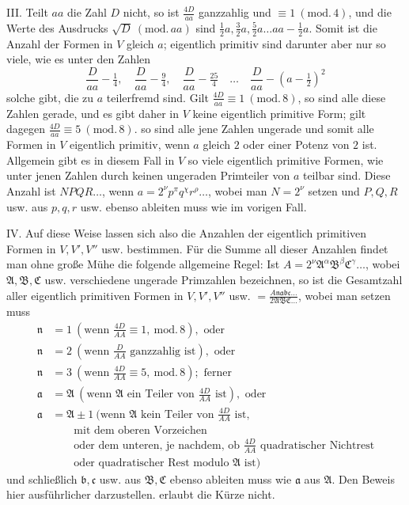 III. Teilt \(aa\) die Zahl \(D\) nicht, so ist \(\frac{4D}{aa}\) ganzzahlig und \(\equiv1\ (\mathrm{mod.}\,4)\), und die Werte des Ausdrucks \(\surd D\ (\mathrm{mod.}\,aa)\) sind \(\frac12 a,\frac32 a,\frac52 a\ldots aa-\frac12 a\). Somit ist die Anzahl der Formen in \(V\) gleich \(a\); eigentlich primitiv sind darunter aber nur so viele, wie es unter den Zahlen
\[
\frac{D}{aa}-\tfrac14,\quad\frac{D}{aa}-\tfrac94,\quad\frac{D}{aa}-\tfrac{25}{4}\quad\ldots\quad\frac{D}{aa}-(a-\tfrac12)^2
\]
solche gibt, die zu \(a\) teilerfremd sind. Gilt \(\frac{4D}{aa}\equiv1\ (\mathrm{mod.}\,8)\), so sind alle diese Zahlen gerade, und es gibt daher in \(V\) keine eigentlich primitive Form; gilt dagegen \(\frac{4D}{aa}\equiv5\ (\mathrm{mod.}\,8)\). so sind alle jene Zahlen ungerade und somit alle Formen in \(V\) eigentlich primitiv, wenn \(a\) gleich \(2\) oder einer Potenz von \(2\) ist. Allgemein gibt es in diesem Fall in \(V\) so viele eigentlich primitive Formen, wie unter jenen Zahlen durch keinen ungeraden Primteiler von \(a\) teilbar sind. Diese Anzahl ist \(NPQR\ldots\), wenn \(a=2^\nu p^\pi q^\chi r^\rho\ldots\), wobei man \(N=2^\nu\) setzen und \(P,Q,R\) usw. aus \(p,q,r\) usw. ebenso ableiten muss wie im vorigen Fall.

IV. Auf diese Weise lassen sich also die Anzahlen der eigentlich primitiven Formen in \(V,V',V''\) usw. bestimmen. Für die Summe all dieser Anzahlen findet man ohne große Mühe die folgende allgemeine Regel: Ist \(A=2^\nu\mathfrak{A}^\alpha\mathfrak{B}^\beta\mathfrak{C}^\gamma\ldots\), wobei \(\mathfrak A,\mathfrak B,\mathfrak C\) usw. verschiedene ungerade Primzahlen bezeichnen, so ist die Gesamtzahl aller eigentlich primitiven Formen in \(V,V',V''\) usw. \(=\frac{A\mathfrak{nabc}\ldots}{2\mathfrak{ABC}\ldots}\), wobei man setzen muss
\[
\begin{aligned}
\mathfrak n&=1\ (\text{wenn }\tfrac{4D}{AA}\equiv1,\ \mathrm{mod.}\,8),\text{ oder}\\
\mathfrak n&=2\ (\text{wenn }\tfrac{D}{AA}\text{ ganzzahlig ist}),\text{ oder}\\
\mathfrak n&=3\ (\text{wenn }\tfrac{4D}{AA}\equiv5,\ \mathrm{mod.}\,8);\text{ ferner}\\
\mathfrak a&=\mathfrak A\ (\text{wenn }\mathfrak A\text{ ein Teiler von }\tfrac{4D}{AA}\text{ ist}),\text{ oder}\\
\mathfrak a&=\mathfrak A\pm1\ (\text{wenn }\mathfrak A\text{ kein Teiler von }\tfrac{4D}{AA}\text{ ist,}\\ &\qquad\text{mit dem oberen Vorzeichen}\\
&\qquad\text{oder dem unteren, je nachdem, ob }\tfrac{4D}{AA}\text{ quadratischer Nichtrest}\\ &\qquad\text{oder quadratischer Rest modulo }\mathfrak A\text{ ist})
\end{aligned}
\]
und schließlich \(\mathfrak b,\mathfrak c\) usw. aus \(\mathfrak B,\mathfrak C\) ebenso ableiten muss wie \(\mathfrak a\) aus \(\mathfrak A\). Den Beweis hier ausführlicher darzustellen. erlaubt die Kürze nicht.

